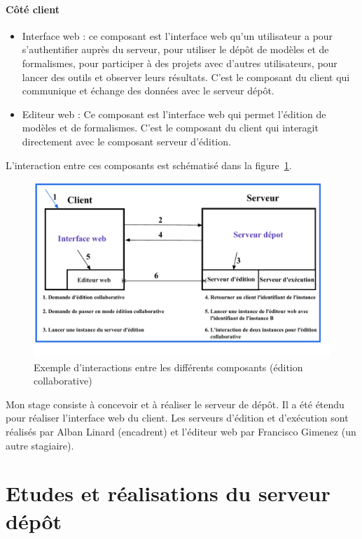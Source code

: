 \documentclass{report}
\begin{document}
\subsubsection{Côté client}

\begin{itemize}
\item Interface web : ce composant est l'interface web qu'un utilisateur a pour s'authentifier auprès du serveur, pour utiliser le dépôt de modèles et de formalismes, pour participer à des projets avec d'autres utilisateurs, pour lancer des outils et observer leurs résultats. C'est le composant du client qui communique et échange des données avec le serveur dépôt.
\item Editeur web : Ce composant est l'interface web qui permet l'édition de modèles et de formalismes. C'est le composant du client qui interagit directement avec le composant serveur d'édition.
\end{itemize}

L'interaction entre ces composants est schématisé dans la
figure~\ref{fig:interaction}.
\begin{figure}[h!]
    \centering
    \includegraphics[scale=0.60]{img/cosyverif_composants.pdf}
    \caption{Exemple d'interactions entre les différents composants (édition collaborative)}
    \label{fig:interaction}
\end{figure}

\medskip

Mon stage consiste à concevoir et à réaliser le serveur de dépôt. Il a été
étendu pour réaliser l'interface web du client. Les serveurs d'édition et
d'exécution sont réalisés par Alban Linard (encadrent) et l'éditeur web par
Francisco Gimenez (un autre stagiaire).


\chapter{Etudes et réalisations du serveur dépôt}
\end{document}
